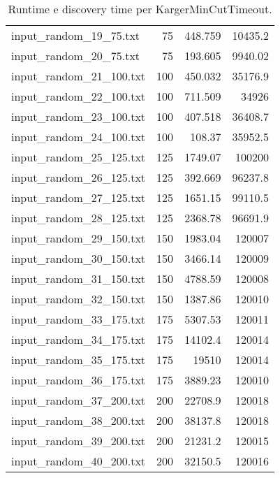 \begin{table}[H]
\begin{tabular}{lrrr}
     input\_random\_19\_75.txt  &      75 &          448.759 &      10435.2   \\
     input\_random\_20\_75.txt  &      75 &          193.605 &       9940.02  \\
     input\_random\_21\_100.txt &     100 &          450.032 &      35176.9   \\
     input\_random\_22\_100.txt &     100 &          711.509 &      34926     \\
     input\_random\_23\_100.txt &     100 &          407.518 &      36408.7   \\
     input\_random\_24\_100.txt &     100 &          108.37  &      35952.5   \\
     input\_random\_25\_125.txt &     125 &         1749.07  &     100200     \\
     input\_random\_26\_125.txt &     125 &          392.669 &      96237.8   \\
     input\_random\_27\_125.txt &     125 &         1651.15  &      99110.5   \\
     input\_random\_28\_125.txt &     125 &         2368.78  &      96691.9   \\
     input\_random\_29\_150.txt &     150 &         1983.04  &     120007     \\
     input\_random\_30\_150.txt &     150 &         3466.14  &     120009     \\
     input\_random\_31\_150.txt &     150 &         4788.59  &     120008     \\
     input\_random\_32\_150.txt &     150 &         1387.86  &     120010     \\
     input\_random\_33\_175.txt &     175 &         5307.53  &     120011     \\
     input\_random\_34\_175.txt &     175 &        14102.4   &     120014     \\
     input\_random\_35\_175.txt &     175 &        19510     &     120014     \\
     input\_random\_36\_175.txt &     175 &         3889.23  &     120010     \\
     input\_random\_37\_200.txt &     200 &        22708.9   &     120018     \\
     input\_random\_38\_200.txt &     200 &        38137.8   &     120018     \\
     input\_random\_39\_200.txt &     200 &        21231.2   &     120015     \\
     input\_random\_40\_200.txt &     200 &        32150.5   &     120016     \\
     \hline
    \end{tabular}

    \caption{Runtime e discovery time per KargerMinCutTimeout.}
    \label{table:kargertimeout-running-time}
\end{table}

